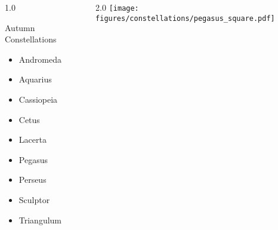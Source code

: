 \documentclass[final]{beamer}
\newlength{\colwidth}
\begin{document}
\begin{frame}[t]{}
  \begin{columns}[T]
    \begin{column}{1.0\colwidth}
      \Large
      \begin{block}{Autumn Constellations}
        \begin{itemize}
          \item{Andromeda}
          \item{Aquarius}
          \item{Cassiopeia}
          \item{Cetus}
          \item{Lacerta}
          \item{Pegasus}
          \item{Perseus}
          \item{Sculptor}
          \item{Triangulum}
        \end{itemize}
      \end{block}
    \end{column}
    \begin{column}{2.0\colwidth}
      \centering
      \texttt{[image: figures/constellations/pegasus\_square.pdf]}
    \end{column}
  \end{columns}
\end{frame}

\end{document}
